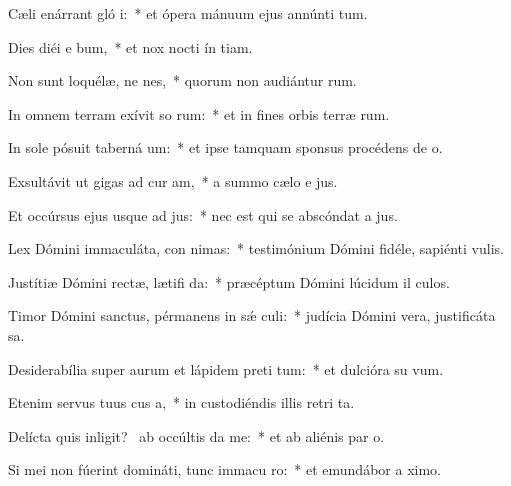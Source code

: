 \item Cæli enárrant gló i:~* et ópera mánuum ejus annúnti tum.
\item Dies diéi e bum,~* et nox nocti ín tiam.
\item Non sunt loquélæ, ne nes,~* quorum non audiántur  rum.
\item In omnem terram exívit so rum:~* et in fines orbis terræ  rum.
\item In sole pósuit taberná um:~* et ipse tamquam sponsus procédens de  o.
\item Exsultávit ut gigas ad cur am,~* a summo cælo e jus.
\item Et occúrsus ejus usque ad  jus:~* nec est qui se abscóndat a  jus.
\item Lex Dómini immaculáta, con nimas:~* testimónium Dómini fidéle, sapiénti  vulis.
\item Justítiæ Dómini rectæ, lætifi da:~* præcéptum Dómini lúcidum il culos.
\item Timor Dómini sanctus, pérmanens in sǽ culi:~* judícia Dómini vera, justificáta  sa.
\item Desiderabília super aurum et lápidem preti tum:~* et dulcióra su   vum.
\item Etenim servus tuus cus a,~* in custodiéndis illis retri ta.
\item Delícta quis inligit?~\pscross{} ab occúltis  da me:~* et ab aliénis par  o.
\item Si mei non fúerint domináti, tunc immacu ro:~* et emundábor a  ximo.
